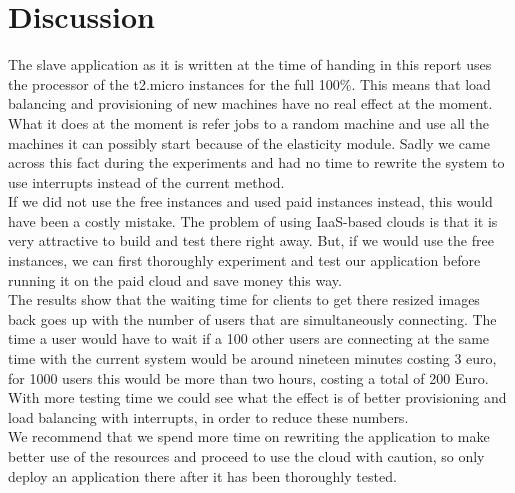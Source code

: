 \section{Discussion}
\label{discussion}
The slave application as it is written at the time of handing in this report uses the processor of the t2.micro instances for the full 100\%. This means that load balancing and provisioning of new machines have no real effect at the moment. What it does at the moment is refer jobs to a random machine and use all the machines it can possibly start because of the elasticity module. Sadly we came across this fact during the experiments and had no time to rewrite the system to use interrupts instead of the current method.\\
If we did not use the free instances and used paid instances instead, this would have been a costly mistake. The problem of using IaaS-based clouds is that it is very attractive to build and test there right away. But, if we would use the free instances, we can first thoroughly experiment and test our application before running it on the paid cloud and save money this way.\\
The results show that the waiting time for clients to get there resized images back goes up with the number of users that are simultaneously connecting. The time a user would have to wait if a 100 other users are connecting at the same time with the current system would be around nineteen minutes costing 3 euro, for 1000 users this would be more than two hours, costing a total of 200 Euro. With more testing time we could see what the effect is of better provisioning and load balancing with interrupts, in order to reduce these numbers.\\
We recommend that we spend more time on rewriting the application to make better use of the resources and proceed to use the cloud with caution, so only deploy an application there after it has been thoroughly tested.